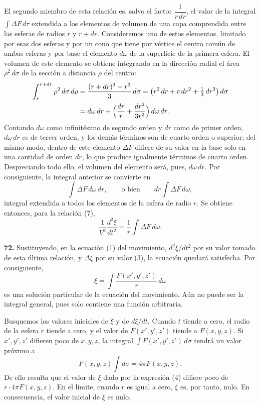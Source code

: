 El segundo miembro de esta relación es, salvo el factor $\dfrac{1}{r\,dr}$,
el valor de la integral $\int \Delta F\,d\tau$ extendida a los elementos de
volumen de una capa comprendida entre las esferas de radios $r$ y $r+dr$.
Consideremos uno de estos elementos, limitado por esas dos esferas y por un
cono que tiene por vértice el centro común de ambas esferas y por base el
elemento $d\omega$ de la superficie de la primera esfera. El volumen de
este elemento se obtiene integrando en la dirección radial el área
$\rho^2\,d\sigma$ de la sección a distancia $\rho$ del centro:
\begin{align*}
\int_r^{r+dr}\rho^2\,d\sigma\,d\rho
&= \frac{(r+dr)^3-r^3}{3}\,d\sigma
= \bigl(r^2\,dr + r\,dr^2 + \tfrac13\,dr^3\bigr)\,d\sigma \\
&= d\omega\,dr + \Bigl(\frac{dr}{r}+\frac{dr^2}{3r^2}\Bigr)\,d\omega\,dr .
\end{align*}
Contando $d\omega$ como infinitésimo de segundo orden y $dr$ como de primer
orden, $d\omega\,dr$ es de tercer orden, y los demás términos son de
cuarto orden o superior; del mismo modo, dentro de este elemento $\Delta F$
difiere de su valor en la base solo en una cantidad de orden $dr$, lo que
produce igualmente términos de cuarto orden. Despreciando todo ello, el
volumen del elemento será, pues, $d\omega\,dr$. Por consiguiente, la
integral anterior se convierte en
\[
\int \Delta F\,d\omega\,dr,\qquad\text{o bien}\qquad dr\int \Delta F\,d\omega,
\]
integral extendida a todos los elementos de la esfera de radio $r$. Se
obtiene entonces, para la relación (7),
\[
\frac{1}{V^2}\frac{d^2\xi}{dt^2} = \frac{1}{r}\int \Delta F\,d\omega. \tag{8}
\]

\noindent\textbf{72.} Sustituyendo, en la ecuación (1) del movimiento,
$d^2\xi/dt^2$ por su valor tomado de esta última relación, y $\Delta\xi$
por su valor (3), la ecuación quedará satisfecha. Por consiguiente,
\[
\xi = \int \frac{F(x',y',z')}{r}\,d\omega
\]
es una solución particular de la ecuación del movimiento. Aún no puede ser
la integral general, pues solo contiene una función arbitraria.

Busquemos los valores iniciales de $\xi$ y de $d\xi/dt$. Cuando $t$ tiende
a cero, el radio de la esfera $r$ tiende a cero, y el valor de
$F(x',y',z')$ tiende a $F(x,y,z)$. Si $x',y',z'$ difieren poco de $x,y,z$,
la integral $\int F(x',y',z')\,d\sigma$ tendrá un valor próximo a
\[
F(x,y,z)\int d\sigma = 4\pi F(x,y,z).
\]
De ello resulta que el valor de $\xi$ dado por la expresión (4) difiere
poco de $r\cdot 4\pi F(x,y,z)$. En el límite, cuando $r$ es igual a cero,
$\xi$ es, por tanto, nulo. En consecuencia, el valor inicial de $\xi$ es
nulo.

